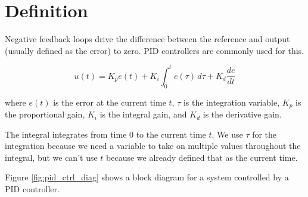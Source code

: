 \section{Definition}

Negative feedback loops drive the difference between the \gls{reference} and
\gls{output} (usually defined as the \gls{error}) to zero. PID controllers are
commonly used for this.

\begin{definition}
  \begin{equation}
    u(t) = K_p e(t) + K_i \int_0^t e(\tau) \,d\tau + K_d \frac{de}{dt}
    \label{eq:pos_pid}
  \end{equation}

  where $e(t)$ is the error at the current time $t$, $\tau$ is the integration
  variable, $K_p$ is the proportional gain, $K_i$ is the integral gain, and
  $K_d$ is the derivative gain.
\end{definition}

The integral integrates from time $0$ to the current time $t$. We use $\tau$ for
the integration because we need a variable to take on multiple values throughout
the integral, but we can't use $t$ because we already defined that as the
current time.

Figure \ref{fig:pid_ctrl_diag} shows a block diagram for a \gls{system}
controlled by a PID controller.

